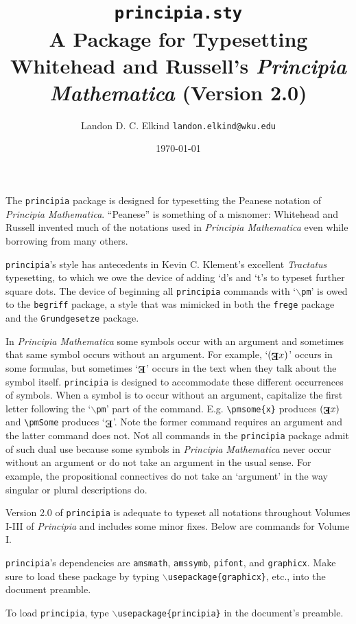 \documentclass[12pt]{article}
\title{\texttt{principia.sty}\\ A \LaTeXe \space Package for Typesetting Whitehead and Russell's \textit{Principia Mathematica} (Version 2.0)}
\author{Landon D. C. Elkind \texttt{landon.elkind@wku.edu}}
\date{\today}
\newcommand{\pmsome}[1]{(\text{\raisebox{.5em}{\rotatebox{180}{\textbf{E}}}}#1)} %
\newcommand{\pmSome}{\text{\raisebox{.5em}{\rotatebox{180}{\textbf{E}}}}}
\begin{document}
\maketitle
\onehalfspacing
The \texttt{principia} package is designed for typesetting the Peanese notation of \textit{Principia Mathematica}. ``Peanese'' is something of a misnomer: Whitehead and Russell invented much of the notations used in \textit{Principia Mathematica} even while borrowing from many others.

\texttt{principia}'s style has antecedents in Kevin C. Klement's excellent \textit{Tractatus} typesetting, to which we owe the device of adding `d's and `t's to typeset further square dots. The device of beginning all \texttt{principia} commands with `\texttt{$\backslash$pm}' is owed to the \texttt{begriff} package, a style that was mimicked in both the \texttt{frege} package and the \texttt{Grundgesetze} package. 

In \textit{Principia Mathematica} some symbols occur with an argument and sometimes that same symbol occurs without an argument. For example, `$\pmsome{x}$' occurs in some formulas, but sometimes `$\pmSome$' occurs in the text when they talk about the symbol itself. \texttt{principia} is designed to accommodate these different occurrences of symbols. When a symbol is to occur without an argument, capitalize the first letter following the `\texttt{$\backslash$pm}' part of the command. E.g. \verb|\pmsome{x}| produces $\pmsome{x}$ and \verb|\pmSome| produces `$\pmSome$'. Note the former command requires an argument and the latter command does not. Not all commands in the \texttt{principia} package admit of such dual use because some symbols in \textit{Principia Mathematica} never occur without an argument or do not take an argument in the usual sense. For example, the propositional connectives do not take an `argument' in the way singular or plural descriptions do.

Version 2.0 of \texttt{principia} is adequate to typeset all notations throughout Volumes I-III of \textit{Principia} and includes some minor fixes. Below are commands for Volume I.

\texttt{principia}'s dependencies are \texttt{amsmath}, \texttt{amssymb}, \texttt{pifont}, and \texttt{graphicx}. Make sure to load these package by typing \texttt{$\backslash$usepackage\{graphicx\}}, etc., into the document preamble. 

To load \texttt{principia}, type \texttt{$\backslash$usepackage\{principia\}} in the document's preamble.
\end{document}
